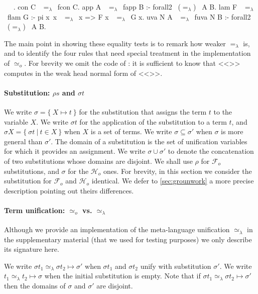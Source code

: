 \documentclass[sigconf,natbib=false,review]{acmart}
\newcommand{\EqualRel}{\ensuremath{=}}
\newcommand{\UnifRel}{\ensuremath{\simeq}}
\newcommand{\Uo}{\ensuremath{\UnifRel_o}\xspace}
\newcommand{\Ue}{\ensuremath{\UnifRel_\lambda}\xspace}
\newcommand{\Ee}{\ensuremath{\EqualRel_\lambda}\xspace}
\newcommand{\Fo}{\ensuremath{\mathcal{F}_{\!o}\xspace}} %
\newcommand{\Ho}{\ensuremath{\mathcal{H}_o}\xspace}
\begin{document}


\begin{elpicode}
  ~ \PYG{n+nf}{(\Ee)} ~.
  con C ~\Ee~fcon C.
  app A ~\Ee~fapp B :- forall2 ~(\Ee)~ A B.
  lam F ~\Ee~flam G :- pi x\ x ~\Ee~x => F x ~\Ee~G x.
  uva N A ~\Ee~fuva N B :- forall2 ~(\Ee)~ A B.
\end{elpicode}

\noindent
The main point in showing these equality tests is to remark how
weaker \Ee is, and to identify the four rules that need special
treatment in the implementation of \Uo.
For brevity we omit the code of :
it is sufficient to know that <<>> computes in  the
weak head normal form of <<>>.

\paragraph{Substitution: $\rho s$ and $\sigma t$}

We write $\sigma = \{~ X \mapsto t ~\}$ for the substitution that assigns
the term $t$ to the variable $X$.
We write $\sigma t$ for the application of
the substitution to a term $t$, and $\sigma X = \{~ \sigma t ~|~ t \in X ~\}$ when
$X$ is a set of terms.
We write $\sigma \subseteq \sigma'$ when $\sigma$ is more
general than $\sigma'$.
The domain of a substitution is the set of unification variables for which
it provides an assignment.
We write $\sigma \cup \sigma'$ to denote the concatenation of
two substitutions whose domains are disjoint.
We shall use $\rho$ for \Fo{} substitutions,
and $\sigma$ for the \Ho ones.
For brevity, in this section we consider
the substitution for \Fo{} and \Ho{} identical.
We defer to \cref{sec:grounwork} a more precise description
pointing out theirs differences.

\paragraph{Term unification: \Uo vs. \Ue}

Although we provide an implementation of the meta-language unification \Ue
in the supplementary material (that we used for testing purposes) we only
describe its signature here.



We write 
$\sigma t_1 \Ue \sigma t_2 \mapsto \sigma'$ when
$\sigma t_1$ and $\sigma t_2$ unify with substitution $\sigma'$.
We write $t_1 \Ue t_2 \mapsto \sigma$ when
the initial substitution is empty.
Note that if $\sigma t_1 \Ue \sigma t_2 \mapsto \sigma'$ then
the domains of $\sigma$ and $\sigma'$ are disjoint.
\end{document}
